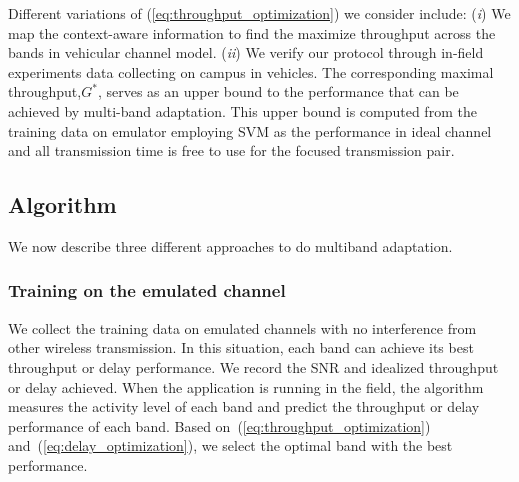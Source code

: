 

Different variations of (\ref{eq:throughput_optimization}) we consider include: 
(\emph{i}) We map the context-aware information to find the maximize throughput across the bands in vehicular channel model.
(\emph{ii}) We verify our protocol through in-field experiments data collecting on campus in vehicles. 
The corresponding maximal throughput,$G^*$, serves as an upper bound to the performance that can be achieved by multi-band adaptation. 
This upper bound is computed from the training data on emulator employing SVM as the performance in ideal channel and all transmission time is free to use for the focused transmission pair.



\subsection{Algorithm}
\label{subsec:algorithm}
We now describe three different approaches to do multiband adaptation.
\subsubsection{Training on the emulated channel}
We collect the training data on emulated channels with no interference from
other wireless transmission. In this
situation, each band can achieve its best throughput or delay performance.
We record the SNR and idealized throughput or delay achieved. When the application
is running in the field, the algorithm measures the activity level of each band 
and predict the throughput or delay performance of each band.
Based on~(\ref{eq:throughput_optimization}) 
and~(\ref{eq:delay_optimization}), we select the optimal band with the best
performance.

